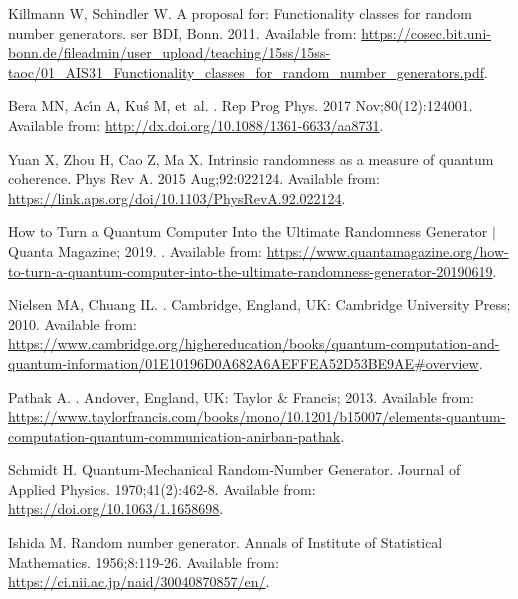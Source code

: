\documentclass[]{interact}
\theoremstyle{plain}%
\theoremstyle{definition}
\theoremstyle{remark}
\begin{document}
\begin{thebibliography}{100}
Killmann W, Schindler W.
\newblock A proposal for: Functionality classes for random number generators.
\newblock ser BDI, Bonn. 2011.
\newblock Available from:
  \url{https://cosec.bit.uni-bonn.de/fileadmin/user_upload/teaching/15ss/15ss-taoc/01_AIS31_Functionality_classes_for_random_number_generators.pdf}.

Bera MN, Ac{\ifmmode\acute{\imath}\else\'{\i}\fi}n A,
  Ku{\ifmmode{}\else\'{s}\fi} M, et~al.
.
\newblock Rep Prog Phys. 2017 Nov;80(12):124001.
\newblock Available from: \url{http://dx.doi.org/10.1088/1361-6633/aa8731}.

Yuan X, Zhou H, Cao Z, Ma X.
\newblock Intrinsic randomness as a measure of quantum coherence.
\newblock Phys Rev A. 2015 Aug;92:022124.
\newblock Available from:
  \url{https://link.aps.org/doi/10.1103/PhysRevA.92.022124}.

{How to Turn a Quantum Computer Into the Ultimate Randomness Generator
  {$\vert$} Quanta Magazine}; 2019.
.
\newblock Available from:
  \url{https://www.quantamagazine.org/how-to-turn-a-quantum-computer-into-the-ultimate-randomness-generator-20190619}.

Nielsen MA, Chuang IL.
.
\newblock Cambridge, England, UK: Cambridge University Press; 2010.
\newblock Available from:
  \url{https://www.cambridge.org/highereducation/books/quantum-computation-and-quantum-information/01E10196D0A682A6AEFFEA52D53BE9AE#overview}.

Pathak A.
.
\newblock Andover, England, UK: Taylor {\&} Francis; 2013.
\newblock Available from:
  \url{https://www.taylorfrancis.com/books/mono/10.1201/b15007/elements-quantum-computation-quantum-communication-anirban-pathak}.

Schmidt H.
\newblock Quantum‐Mechanical Random‐Number Generator.
\newblock Journal of Applied Physics. 1970;41(2):462-8.
\newblock Available from: \url{https://doi.org/10.1063/1.1658698}.

Ishida M.
\newblock Random number generator.
\newblock Annals of Institute of Statistical Mathematics. 1956;8:119-26.
\newblock Available from: \url{https://ci.nii.ac.jp/naid/30040870857/en/}.


\end{thebibliography}
\end{document}
